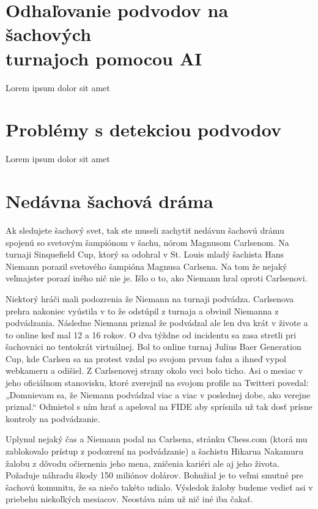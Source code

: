 \documentclass[10pt,oneside,slovak,a4paper]{article}
\begin{document}
\section{Odhaľovanie podvodov na šachových\\
	 turnajoch pomocou AI}

Lorem ipsum dolor sit amet


\section{Problémy s detekciou podvodov}

Lorem ipsum dolor sit amet


\section{Nedávna šachová dráma}

Ak sledujete šachový svet, tak ste museli zachytiť nedávnu šachovú drámu spojenú so svetovým šampiónom v šachu, nórom Magnusom Carlsenom. Na turnaji Sinquefield Cup, ktorý sa odohral v St. Louis mladý šachista Hans Niemann porazil svetového šampióna Magnusa Carlsena. Na tom že nejaký veľmajster porazí iného nič nie je. Išlo o to, ako Niemann hral oproti Carlsenovi.

Niektorý hráči mali podozrenia že Niemann na turnaji podvádza. Carlsenova prehra nakoniec vyústila v to že odstúpil z turnaja a obvinil Niemanna z podvádzania. Následne Niemann priznal že podvádzal ale len dva krát v živote a to online keď mal 12 a 16 rokov. O dva týždne od incidentu sa zasa stretli pri šachovnici no tentokrát virtuálnej. Bol to online turnaj Julius Baer Generation Cup, kde Carlsen sa na protest vzdal po svojom prvom ťahu a ihneď vypol webkameru a odišiel. Z Carlsenovej strany okolo veci bolo ticho. Asi o mesiac v jeho oficiálnom stanovisku, ktoré zverejnil na svojom profile na Twitteri povedal: „Domnievam sa, že Niemann podvádzal viac a viac v poslednej dobe, ako verejne priznal.“\cite{TWI} Odmietol s ním hrať a apeloval na FIDE aby sprísnila už tak dosť prísne kontroly na podvádzanie.

Uplynul nejaký čas a Niemann podal na Carlsena, stránku Chess.com (ktorá mu zablokovalo prístup z podozrení na podvádzanie) a šachistu Hikarua Nakamuru žalobu z dôvodu očiernenia jeho mena, zničenia kariéri ale aj jeho života. Požaduje náhradu škody 150 miliónov dolárov. Bohužial je to veľmi smutné pre šachovú komunitu, že sa niečo takéto udialo. Výsledok žaloby budeme vedieť asi v priebehu niekoľkých mesiacov. Neostáva nám už nič iné iba čakať.
\end{document}
